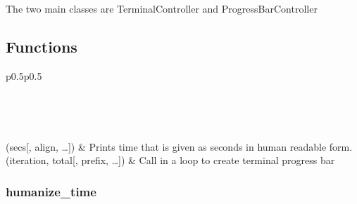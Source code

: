 \documentclass[a4paper,10pt,english]{sphinxmanual}
\begin{document}
The two main classes are TerminalController and ProgressBarController


\subsection{Functions}
\label{\detokenize{references:functions}}

\begin{savenotes}\sphinxatlongtablestart\begin{longtable}{p{0.5\linewidth}p{0.5\linewidth}}
\hline

\endfirsthead

%
{}\\
\hline

\endhead

\hline
{}\\
\endfoot

\endlastfoot

(secs{[}, align, …{]})
&
Prints time that is given as seconds in human readable form.
\\
\hline
{}(iteration, total{[}, prefix, …{]})
&
Call in a loop to create terminal progress bar
\\
\hline
\end{longtable}\sphinxatlongtableend\end{savenotes}


\subsubsection{humanize\_time}
\label{\detokenize{api/termtools.terminal.humanize_time::doc}}\label{\detokenize{api/termtools.terminal.humanize_time:humanize-time}}
\end{document}
